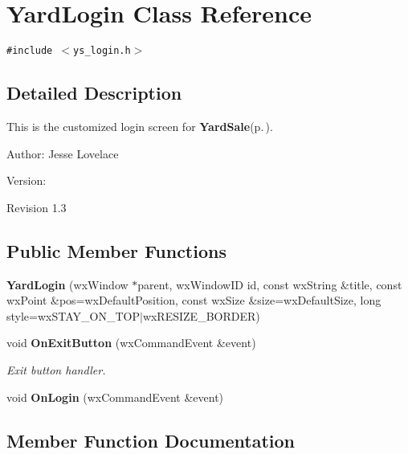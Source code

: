 \section{Yard\-Login Class Reference}
\label{classYardLogin}
{\tt \#include $<$ys\_\-login.h$>$}



\subsection{Detailed Description}
This is the customized login screen for {\bf Yard\-Sale}{\rm (p.\,\pageref{classYardSale})}. 

\begin{Desc}
\item[Author:]Jesse Lovelace \end{Desc}
\begin{Desc}
\item[Version:]\begin{Desc}
\item[Revision]1.3 \end{Desc}
\end{Desc}


\subsection*{Public Member Functions}
\begin{CompactItemize}
\item 
{\bf Yard\-Login} (wx\-Window $\ast$parent, wx\-Window\-ID id, const wx\-String \&title, const wx\-Point \&pos=wx\-Default\-Position, const wx\-Size \&size=wx\-Default\-Size, long style=wx\-STAY\_\-ON\_\-TOP$|$wx\-RESIZE\_\-BORDER)\label{classYardLogin_a0}

\item 
void {\bf On\-Exit\-Button} (wx\-Command\-Event \&event)
\begin{CompactList}\small\item\em Exit button handler. \item\end{CompactList}\item 
void {\bf On\-Login} (wx\-Command\-Event \&event)\label{classYardLogin_a3}

\end{CompactItemize}


\subsection{Member Function Documentation}
